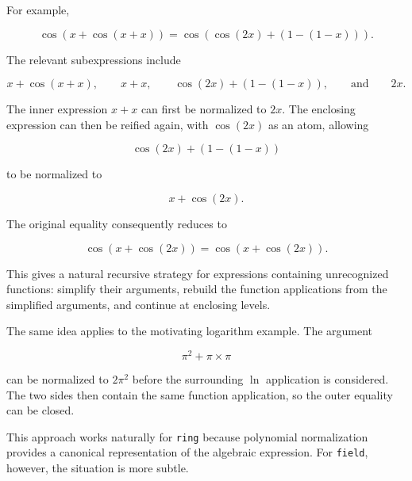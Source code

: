 \documentclass[11pt]{article}
\begin{document}
For example,

$$
  \cos(x+\cos(x+x))
  =
  \cos(\cos(2x)+(1-(1-x))).
$$

The relevant subexpressions include

$$
  x+\cos(x+x),\qquad
  x+x,\qquad
  \cos(2x)+(1-(1-x)),
  \qquad\text{and}\qquad
  2x.
$$

The inner expression $x+x$ can first be normalized to $2x$. The enclosing expression can then be reified again, with $\cos(2x)$ as an atom, allowing

$$
  \cos(2x)+(1-(1-x))
$$

to be normalized to

$$
  x+\cos(2x).
$$

The original equality consequently reduces to

$$
  \cos(x+\cos(2x))
  =
  \cos(x+\cos(2x)).
$$

This gives a natural recursive strategy for expressions containing unrecognized
functions: simplify their arguments, rebuild the function applications from
the simplified arguments, and continue at enclosing levels.

The same idea applies to the motivating logarithm example. The argument

$$
  \pi^2+\pi\mathbin{\times}\pi
$$

can be normalized to $2\pi^2$ before the surrounding $\ln$ application is considered. The two sides then contain the same function application, so the outer equality can be closed.

This approach works naturally for \texttt{ring} because polynomial normalization provides a canonical representation of the algebraic expression. For \texttt{field}, however, the situation is more subtle.

\end{document}
